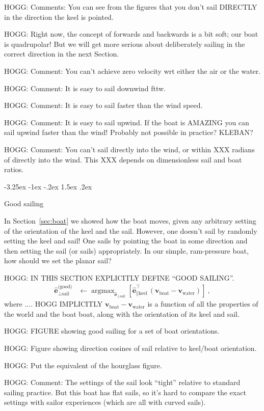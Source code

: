 \documentclass{article}
\makeatletter
\DeclareMathOperator*{\argmax}{argmax}
\renewcommand{\vec}[1]{\boldsymbol{#1}}
\newcommand{\uvec}{\vec{\hat{e}}}
\newcommand{\water}{\text{water}}
\newcommand{\boat}{\text{boat}}
\newcommand{\good}{\text{(good)}}
\newcommand{\sail}{\text{sail}}
\newcommand{\keel}{\text{keel}}
\newcommand{\vwater}{\vec{v}_\water}
\newcommand{\vboat}{\vec{v}_\boat}
\newcommand{\secref}[1]{Section~\ref{#1}}
\renewcommand\section{\@startsection {section}{1}{\z@}%
  {-3.25ex \@plus -1ex \@minus -.2ex}%
  {1.5ex \@plus .2ex}%
  {\raggedright\normalfont\large\bfseries}}
\makeatother
\begin{document}
HOGG: Comments: You can see from the figures that you don't sail DIRECTLY in the direction the keel is pointed.

HOGG: Right now, the concept of forwards and backwards is a bit soft; our boat is quadrupolar! But we will get more serious about deliberately sailing in the correct direction in the next Section.

HOGG: Comment: You can't achieve zero velocity wrt either the air or the water.

HOGG: Comment: It is easy to sail downwind fttw.

HOGG: Comment: It is easy to sail faster than the wind speed.

HOGG: Comment: It is easy to sail upwind. If the boat is AMAZING you can sail upwind faster than the wind! Probably not possible in practice? KLEBAN?

HOGG: Comment: You can't sail directly into the wind, or within XXX radians of directly into the wind. This XXX depends on dimensionless sail and boat ratios.

\section{Good sailing}\label{sec:good}

In \secref{sec:boat} we showed how the boat moves, given any arbitrary setting of the orientation of the keel and the sail.
However, one doesn't sail by randomly setting the keel and sail!
One sails by pointing the boat in some direction and then setting the sail (or sails) appropriately.
In our simple, ram-pressure boat, how should we set the planar sail?

HOGG: IN THIS SECTION EXPLICITLY DEFINE ``GOOD SAILING''.
\begin{align}\label{eq:good}
    \uvec_{\perp\sail}^\good &\leftarrow \argmax_{\uvec_{\perp\sail}} \left[\uvec_{\parallel\keel}^\top\,(\vboat-\vwater)\right] ~,
\end{align}
where .... HOGG IMPLICITLY $\vboat-\vwater$ is a function of all the properties of the world and the boat boat, along with the orientation of its keel and sail.

HOGG: FIGURE showing good sailing for a set of boat orientations.

HOGG: Figure showing direction cosines of sail relative to keel/boat orientation.

HOGG: Put the equivalent of the hourglass figure.

HOGG: Comment: The settings of the sail look ``tight'' relative to standard sailing practice. But this boat has flat sails, so it's hard to compare the exact settings with sailor experiences (which are all with curved sails).
\end{document}
